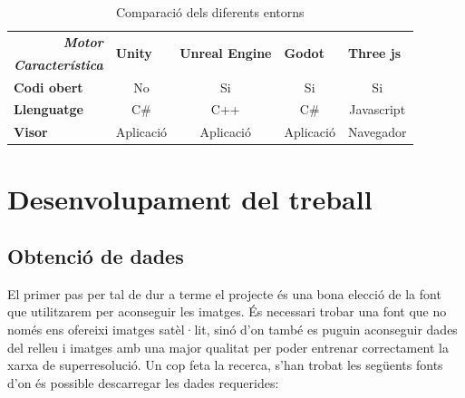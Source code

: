 ﻿\documentclass[10pt,a4paper,twocolumn,twoside]{article}
\begin{document}
\begin{table}[H]
\caption{Comparació dels diferents entorns}
\begin{adjustbox}{width=\columnwidth,center}
\begin{tabular}{|ll|c|c|c|c|}
\hline
\multicolumn{2}{|r|}{\textit{\textbf{Motor}}}          & \multicolumn{1}{l|}{\multirow{2}{*}{\textbf{Unity}}} & \multicolumn{1}{l|}{\multirow{2}{*}{\textbf{Unreal Engine}}} & \multicolumn{1}{l|}{\multirow{2}{*}{\textbf{Godot}}} & \multicolumn{1}{l|}{\multirow{2}{*}{\textbf{Three js}}} \\ \cline{1-2}
\multicolumn{2}{|l|}{\textit{\textbf{Característica}}} & \multicolumn{1}{l|}{}                                & \multicolumn{1}{l|}{}                                        & \multicolumn{1}{l|}{}                                & \multicolumn{1}{l|}{}                                   \\ \hline
\multicolumn{2}{|l|}{\textbf{Codi obert}}              & No                                                   & Si                                                           & Si                                                   & Si                                                      \\ \hline
\multicolumn{2}{|l|}{\textbf{Llenguatge}}              & C\#                                                  & C++                                                          & C\#                                                  & Javascript                                              \\ \hline
\multicolumn{2}{|l|}{\textbf{Visor}}                   & Aplicació                                            & Aplicació                                                    & Aplicació                                            & Navegador                                               \\ \hline
\end{tabular}
\end{adjustbox}
\end{table}
\section{Desenvolupament del treball}


\subsection{Obtenció de dades}
El primer pas per tal de dur a terme el projecte és una bona elecció de la font que utilitzarem per aconseguir les imatges. És necessari trobar una font que no només ens ofereixi imatges satèl·lit, sinó d'on també es puguin aconseguir dades del relleu i imatges amb una major qualitat per poder entrenar correctament la xarxa de superresolució. Un cop feta la recerca, s'han trobat les següents fonts d'on és possible descarregar les dades requerides:
\end{document}
